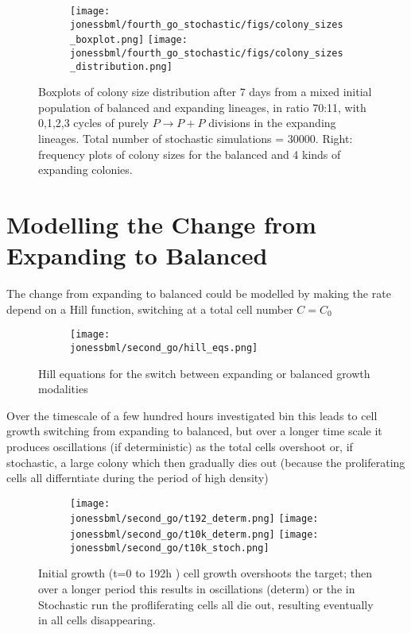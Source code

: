 \documentclass[a4paper,10pt]{report}
\newcommand{\psortbase}{/home/ngrs2/work/bsu/PSORT_Zuliani_Reynolds/}
\newcommand{\sbmlbase}{\psortbase/sbml-sh/}
\newcommand{\jonessbml}{\sbmlbase/jones_like}
\begin{document}
\begin{figure}[h!]
  \centering
  \begin{subfigure}{\textwidth}
    \texttt{[image: \\jonessbml/fourth\_go\_stochastic/figs/colony\_sizes\_boxplot.png]}
    \texttt{[image: \\jonessbml/fourth\_go\_stochastic/figs/colony\_sizes\_distribution.png]}
  \end{subfigure}
  \caption{Boxplots of colony size distribution after 7 days from a mixed initial population of balanced and expanding lineages, in ratio 70:11, with 0,1,2,3 cycles of purely $P \rightarrow P+P$ divisions in the expanding lineages. Total number of stochastic simulations = 30000. Right: frequency plots of colony sizes for the balanced and 4 kinds of expanding colonies.}
  \label{fig:joneslike_sim_mixedlineages}
\end{figure}


\section{Modelling the Change from Expanding to Balanced}

The change from expanding to balanced could be modelled by making the rate
depend on a Hill function, switching at a total cell number $C=C_0$

\begin{figure}[h!]
  \begin{subfigure}{\textwidth}
    \texttt{[image: \\jonessbml/second\_go/hill\_eqs.png]}
  \end{subfigure}
  \caption{Hill equations for the switch between expanding or balanced growth modalities}
  \label{fig:joneslike_hilleq}
\end{figure}

Over the timescale of a few hundred hours investigated bin \cite{roshan2016human} this leads to cell growth switching from expanding to balanced, but over a longer time scale it produces oscillations (if deterministic)  as the total cells overshoot or, if stochastic, a large colony which then gradually dies out (because the proliferating cells all differntiate during the period of high density)

\begin{figure}[h!]
  \begin{subfigure}{\textwidth}
    \texttt{[image: \\jonessbml/second\_go/t192\_determ.png]}
    \texttt{[image: \\jonessbml/second\_go/t10k\_determ.png]}
    \texttt{[image: \\jonessbml/second\_go/t10k\_stoch.png]}
  \end{subfigure}
  \caption{Initial growth (t=0 to 192h ) cell growth overshoots the target; then over a longer period this results in oscillations (determ) or the  in Stochastic run the profliferating cells all die out, resulting eventually in all cells disappearing.}
  \label{fig:joneslike_hill_oscill}
\end{figure}
\end{document}
